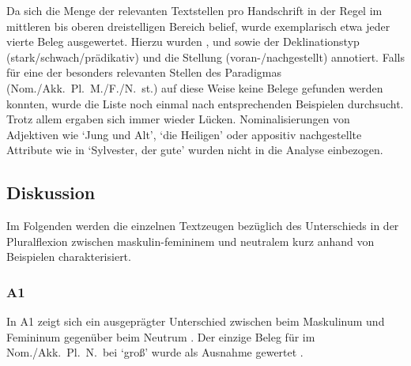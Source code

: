Da sich die Menge der relevanten Textstellen pro Handschrift in der Regel im
mittleren bis oberen dreistelligen Bereich belief, wurde exemplarisch etwa
jeder vierte Beleg ausgewertet. Hierzu wurden ,  und
 sowie der Deklinationstyp (stark/schwach/prädikativ) und die
Stellung (voran-/nach\-ge\-stellt) annotiert. Falls für eine der besonders
relevanten Stellen des Paradigmas (Nom./Akk.\ Pl.\ M./F./N.\ st.) auf diese
Weise keine Belege gefunden werden konnten, wurde die Liste noch einmal nach
entsprechenden Beispielen durchsucht. Trotz allem ergaben sich immer wieder
Lücken. Nominalisierungen von Adjektiven wie  `Jung und
Alt',  `die Heiligen' oder appositiv
nachgestellte Attribute wie in  `Sylvester, der gute'
wurden nicht in die Analyse einbezogen.


\subsection{Diskussion}
\label{subsec:kc_adjflex_disc}

Im Folgenden werden die einzelnen Textzeugen bezüglich des Unterschieds in der
Plural\-flexion zwischen maskulin-femininem  und neutralem
 kurz anhand von Beispielen charakterisiert.

\subsubsection{A1}
In A1 zeigt sich ein ausgeprägter Unterschied zwischen
 beim Maskulinum und Femininum gegenüber  beim Neutrum
. Der einzige Beleg für  im Nom./Akk.\ Pl.\ N.\ bei
 `groß' wurde als Ausnahme gewertet
.

